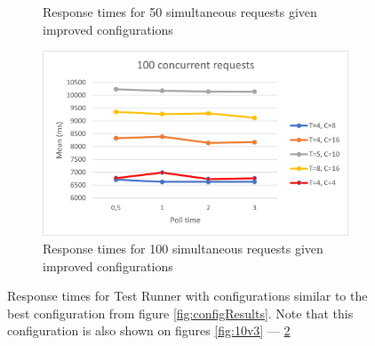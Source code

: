\begin{figure}
\begin{subfigure}[b]{0.45\textwidth}
        \caption{Response times for 50 simultaneous requests given improved configurations}
        \label{fig:50v3}
    \end{subfigure}
    \hfill
    \begin{subfigure}[b]{0.45\textwidth}
      \centering
      \includegraphics[width=\textwidth]{images/100v3.png}
      \caption{Response times for 100 simultaneous requests given improved configurations}
      \label{fig:100v3}
    \end{subfigure}
  \caption{Response times for Test Runner with configurations similar to the best configuration from figure \ref{fig:configResults}. Note that this configuration is also shown on figures \ref{fig:10v3} --- \ref{fig:100v3}}
  \label{fig:improvedConfig}
\end{figure}